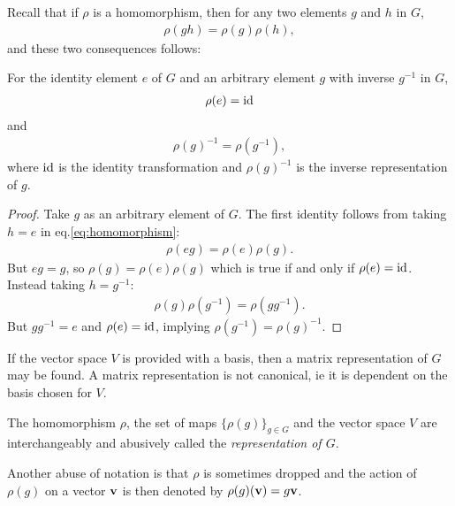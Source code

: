 	Recall that if $\rho$ is a homomorphism, then for any two elements $g$ and $h$ in $G$,
	\begin{align}\label{eq:homomorphism}
		\rho(gh) = \rho(g)\rho(h),
	\end{align}
	and these two consequences follows:	
	\begin{proposition}
		For the identity element $e$ of $G$ and an arbitrary element $g$ with inverse $g^{-1}$ in $G$,
		\begin{align}
			\rho(e) = \text{id}
		\end{align}
		and
		\begin{align}
			\rho(g)^{-1} = \rho(g^{-1}),
		\end{align}
		where $\text{id}$ is the identity transformation and $\rho(g)^{-1}$ is the inverse representation of $g$.
	\end{proposition}
	\begin{proof}
		Take $g$ as an arbitrary element of $G$. The first identity follows from taking $h=e$ in eq.\ref{eq:homomorphism}:
		\begin{align}
			\rho(eg) = \rho(e)\rho(g). %
		\end{align}
		But $eg=g$, so $\rho(g) = \rho(e)\rho(g)$ which is true if and only if $\rho(e) = \text{id}$. Instead taking $h=g^{-1}$:
		\begin{align}
			\rho(g) \rho(g^{-1}) =  \rho(gg^{-1}). %
		\end{align}
		But $gg^{-1} = e$ and $\rho(e) = \text{id}$, implying $\rho(g^{-1}) = \rho(g)^{-1}$.
	\end{proof}
	
	\begin{note}
		If the vector space $V$ is provided with a basis, then a matrix representation of $G$ may be found. A matrix representation is not canonical, ie it is dependent on the basis chosen for $V$. %
	\end{note}
	
	\begin{note}
		The homomorphism $\rho$, the set of maps $\{\rho(g)\}_{g \in G}$ and the vector space $V$ are interchangeably and abusively called the \textit{representation of $G$}.
	\end{note}
	
	\begin{note}
		Another abuse of notation is that $\rho$ is sometimes dropped and the action of $\rho(g)$ on a vector $\mathbf{v}$ is then denoted by $\rho(g)(\mathbf{v}) = g\mathbf{v}$.
	\end{note}
	

